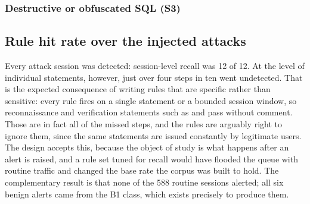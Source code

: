 \subsubsection{Destructive or obfuscated SQL (S3)}






\subsection{Rule hit rate over the injected attacks}
\label{app:rules:hitrate}



Every attack session was detected: session-level recall was 12 of 12. At the level of
individual statements, however, just over four steps in ten went undetected. That is the expected consequence
of writing rules that are specific rather than sensitive: every rule fires on a single
statement or a bounded session window, so reconnaissance and verification statements such as
 and  pass without comment. Those
are in fact all of the missed steps, and the rules are arguably right to ignore them,
since the same statements are issued constantly by legitimate users. The design accepts this, because the object of study is what happens after an
alert is raised, and a rule set tuned for recall would have flooded the queue with
routine traffic and changed the base rate the corpus was built to hold. The
complementary result is that none of the 588 routine sessions alerted; all six benign
alerts came from the B1 class, which exists precisely to produce them.
